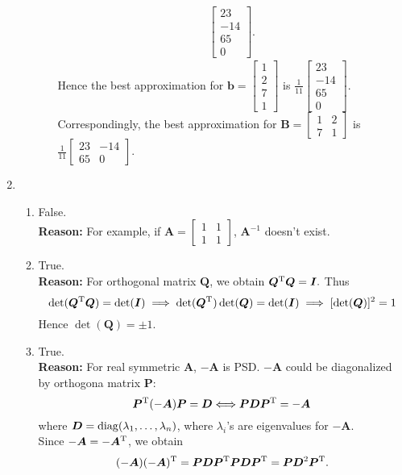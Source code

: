 \begin{enumerate}
\begin{enumerate}
\begin{itemize}
\begin{align*}
\begin{bmatrix}
23\\-14\\65\\0
\end{bmatrix}.
\end{align*}
Hence the best approximation for $\bm b=\begin{bmatrix}
1\\2\\7\\1
\end{bmatrix}$ is $\frac{1}{11}\begin{bmatrix}
23\\-14\\65\\0
\end{bmatrix}.$\\
Correspondingly, the best approximation for $\bm B=\begin{bmatrix}
1&2\\7&1
\end{bmatrix}$ is $\frac{1}{11}\begin{bmatrix}
23&-14\\65&0
\end{bmatrix}.$ 
\end{itemize}
\end{enumerate}
\item
\begin{enumerate}
\item
False.\\
\textbf{Reason: }For example, if $\bm A=\begin{bmatrix}
1&1\\1&1
\end{bmatrix}$, $\bm A^{-1}$ doesn't exist.
\item
True.\\
\textbf{Reason: }For orthogonal matrix $\bm Q$, we obtain $\bm Q^{\mathrm T}\bm Q=\bm I.$ Thus
\[
\det(\bm Q^{\mathrm T}\bm Q)=\det(\bm I)
\implies
\det(\bm Q^{\mathrm T})\det(\bm Q)=\det(\bm I)
\implies
[\det(\bm Q)]^2=1
\]
Hence $\det(\bm Q)=\pm1.$
\item
True.\\
\textbf{Reason: }For real symmetric $\bm A$, $-\bm A$ is PSD. $-\bm A$ could be diagonalized by orthogona matrix $\bm P$:
\[
\bm P^{\mathrm T}(-\bm A)\bm P=\bm D\Longleftrightarrow
\bm P\bm D\bm P^{\mathrm T}=-\bm A
\]
where $\bm D=\operatorname{diag}(\lambda_1,\dots,\lambda_n)$, where $\lambda_i$'s are eigenvalues for $-\bm A$.\\
Since $-\bm A=-\bm A^{\mathrm T}$, we obtain
\[
(-\bm A)(-\bm A)^{\mathrm T}=\bm P\bm D\bm P^{\mathrm T}\bm P\bm D\bm P^{\mathrm T}=\bm P\bm D^2\bm P^{\mathrm T}.
\]
\end{enumerate}
\end{enumerate}
